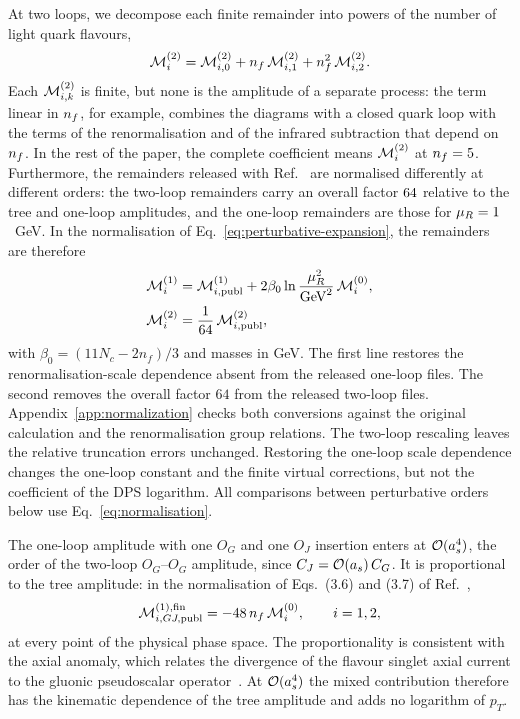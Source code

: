 At two loops, we decompose each finite remainder into powers
of the number of light quark flavours,
\begin{equation}
 \mathcal{M}^{(2)}_{i}=\mathcal{M}^{(2)}_{i,0}+n_f\,\mathcal{M}^{(2)}_{i,1}+n_f^2\,\mathcal{M}^{(2)}_{i,2}.
 \label{eq:nf-decomposition}
\end{equation}
Each $\mathcal{M}^{(2)}_{i,k}$ is finite, but none is the amplitude of
a separate process: the term linear in $n_f$, for example,
combines the diagrams with a closed quark loop with the terms
of the renormalisation and of the infrared subtraction that
depend on $n_f$. In the rest of the paper, the complete
coefficient means $\mathcal{M}^{(2)}_{i}$ at $n_f=5$.
Furthermore, the remainders released with Ref.~\cite{Bhattacharya:2019bmd} are normalised differently at different orders: the two-loop remainders carry an overall factor $64$ relative to the tree and one-loop amplitudes, and the one-loop remainders are those for $\mu_R=1$~GeV. In the normalisation of Eq.~\eqref{eq:perturbative-expansion}, the remainders are therefore
\begin{align}
 \mathcal M_i^{(1)}&=\mathcal M_{i,\mathrm{publ}}^{(1)}+2\beta_0\ln\frac{\mu_R^2}{\mathrm{GeV}^2}\,\mathcal M_i^{(0)},
 \nonumber\\
 \mathcal{M}^{(2)}_{i}&=\frac{1}{64}\,\mathcal M_{i,\mathrm{publ}}^{(2)},
 \label{eq:normalisation}
\end{align}
with $\beta_0=(11N_c-2n_f)/3$ and masses in GeV. The first line restores the renormalisation-scale dependence absent from the released one-loop files.
The second removes the overall factor $64$ from the released two-loop files.
Appendix~\ref{app:normalization} checks both conversions against the original calculation and the renormalisation group relations.
The two-loop rescaling leaves the relative truncation errors unchanged.
Restoring the one-loop scale dependence changes the one-loop constant and the finite virtual corrections, but not the coefficient of the DPS logarithm.
All comparisons between perturbative orders below use Eq.~\eqref{eq:normalisation}.


The one-loop amplitude with one $O_G$ and one $O_J$ insertion enters at $\mathcal{O}(a_s^4)$, the order of the two-loop $O_G$--$O_G$ amplitude, since $C_J=\mathcal{O}(a_s)\,C_G$. It is proportional to the tree amplitude: in the normalisation of Eqs.~(3.6) and (3.7) of Ref.~\cite{Bhattacharya:2019bmd},
\begin{equation}
 \mathcal M^{(1),\mathrm{fin}}_{i,GJ,\mathrm{publ}}
 = -48\,n_f\,\mathcal M_i^{(0)},
 \qquad i=1,2,
 \label{eq:gj-proportional}
\end{equation}
at every point of the physical phase space. The proportionality is consistent with the axial anomaly, which relates the divergence of the flavour singlet axial current to the gluonic pseudoscalar operator~\cite{Adler:1969gk,Bell:1969ts,Larin1993}. At $\mathcal{O}(a_s^4)$ the mixed contribution therefore has the kinematic dependence of the tree amplitude and adds no logarithm of $p_T$.

